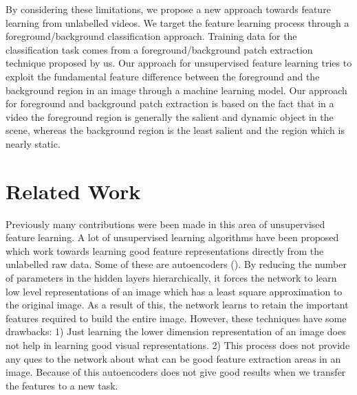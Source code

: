 \documentclass[10pt,twocolumn,letterpaper]{article}
\begin{document}
By considering these limitations, we propose a new approach towards feature learning from unlabelled videos. We target the feature learning process through a foreground/background classification approach. Training data for the classification task comes from a foreground/background patch extraction technique proposed by us. Our approach for unsupervised feature learning tries to exploit the fundamental feature difference between the foreground and the background region in an image through a machine learning model. Our approach for foreground and background patch extraction is based on the fact that in a video the foreground region is generally the salient and dynamic object in the scene, whereas the background region is the least salient and the region which is nearly static.  


\section{Related Work}

Previously many contributions were been made in this area of unsupervised feature learning. A lot of unsupervised learning algorithms have been proposed which work towards learning good feature representations directly from the unlabelled raw data. Some of these are autoencoders (\cite{hinton2006reducing, bengio2009learning}). By reducing the number of parameters in the hidden layers hierarchically, it forces the network to learn low level representations of an image which has a least square approximation to the original image. As a result of this, the network learns to retain the important features required to build the entire image. However, these techniques have some drawbacks: 1) Just learning the lower dimension representation of an image does not help in learning good visual representations. 2) This process does not provide any ques to the network about what can be good feature extraction areas in an image. Because of this autoencoders does not give good results when we transfer the features to a new task.
\end{document}
